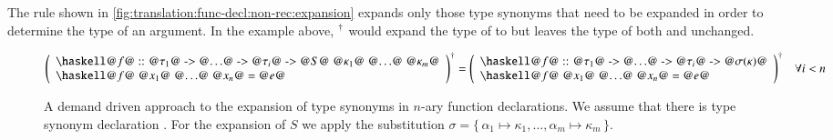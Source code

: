 The rule shown in \autoref{fig:translation:func-decl:non-rec:expansion} expands only those type synonyms that need to be expanded in order to determine the type of an argument.
In the example above, ${}^{\dagger}$ would expand the type of  to  but leaves the type of both  and  unchanged.

\begin{figure}[H]
  \begin{align*}
    \toCoq{\left(
      \begin{array}{l}
        \haskellM{@$f$@ :: @$\tau_1$@ -> @$\ldots$@ -> @$\tau_i$@ -> @$S$@ @$\kappa_1$@ @$\ldots$@ @$\kappa_m$@} \\
        \haskellM{@$f$@ @$x_1$@ @$\ldots$@ @$x_n$@ = @$e$@}
      \end{array}
    \right)}
    = \toCoq{\left(
      \begin{array}{l}
        \haskellM{@$f$@ :: @$\tau_1$@ -> @$\ldots$@ -> @$\tau_i$@ -> @$\sigma(\kappa)$@} \\
        \haskellM{@$f$@ @$x_1$@ @$\ldots$@ @$x_n$@ = @$e$@}
      \end{array}
    \right)}
    &&\forall i < n
  \end{align*}
  \caption{
    A demand driven approach to the expansion of type synonyms in $n$-ary function declarations.
    We assume that there is type synonym declaration .
    For the expansion of $S$ we apply the substitution $\sigma = \{\, \alpha_1 \mapsto \kappa_1, \ldots, \alpha_m \mapsto \kappa_m \,\}$.
  }
  \label{fig:translation:func-decl:non-rec:expansion}
\end{figure}

